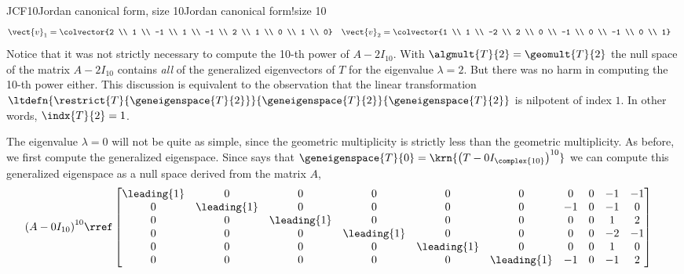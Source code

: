 \begin{example}{JCF10}{Jordan canonical form, size 10}{Jordan canonical form!size 10}
%
\begin{align*}
\vect{v}_1&=\colvector{2 \\ 1 \\ -1 \\ 1 \\ -1 \\ 2 \\ 1 \\ 0 \\ 1 \\ 0}
&
\vect{v}_2&=\colvector{1 \\ 1 \\ -2 \\ 2 \\ 0 \\ -1 \\ 0 \\ -1 \\ 0 \\ 1}
\end{align*}
%
Notice that it was not strictly necessary to compute the 10-th power of $A-2I_{10}$.  With $\algmult{T}{2}=\geomult{T}{2}$ the null space of the matrix $A-2I_{10}$ contains {\em all} of the generalized eigenvectors of $T$ for the eigenvalue $\lambda=2$.  But there was no harm in computing the 10-th power either.  This discussion is equivalent to the observation that the linear transformation $\ltdefn{\restrict{T}{\geneigenspace{T}{2}}}{\geneigenspace{T}{2}}{\geneigenspace{T}{2}}$ is nilpotent of index $1$.  In other words, $\indx{T}{2}=1$.\par
%
The eigenvalue $\lambda=0$ will not be quite as simple, since the geometric multiplicity is strictly less than the geometric multiplicity.  As before, we first compute the generalized eigenspace.  Since  says that $\geneigenspace{T}{0}=\krn{\left(T-0I_{\complex{10}}\right)^{10}}$ we can compute this generalized eigenspace as a null space derived from the matrix $A$,
%
\begin{align*}
\left(A-0I_{10}\right)^{10}
&\rref
\begin{bmatrix}
 \leading{1} & 0 & 0 & 0 & 0 & 0 & 0 & 0 & -1 & -1 \\
 0 & \leading{1} & 0 & 0 & 0 & 0 & -1 & 0 & -1 & 0 \\
 0 & 0 & \leading{1} & 0 & 0 & 0 & 0 & 0 & 1 & 2 \\
 0 & 0 & 0 & \leading{1} & 0 & 0 & 0 & 0 & -2 & -1 \\
 0 & 0 & 0 & 0 & \leading{1} & 0 & 0 & 0 & 1 & 0 \\
 0 & 0 & 0 & 0 & 0 & \leading{1} & -1 & 0 & -1 & 2 \\

\end{bmatrix}
\end{align*}
\end{example}
